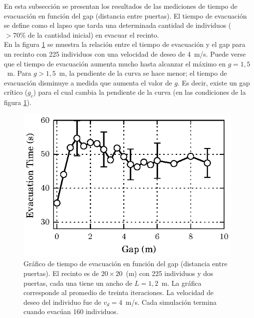 En esta subsección se presentan los resultados de las mediciones de tiempo de evacuación en función del gap (distancia entre puertas).
El tiempo de evacuación se define como el lapso que tarda una determinada cantidad de individuos ($>70\%$ de la cantidad inicial) en evacuar el recinto. \\

En la figura \ref{gap_vste_225_v4} se muestra la relación entre el tiempo de evacuación y el gap para un recinto con 225 individuos con una velocidad de deseo de 4~m/s. Puede verse que el tiempo de evacuación aumenta mucho hasta alcanzar el máximo en $g=1,5$~m. Para $g>1,5$~m, la pendiente de la curva se hace menor; el tiempo de evacuación disminuye a medida que aumenta el valor de $g$. 
Es decir, existe un gap crítico ($g_c$) para el cual cambia la pendiente de la curva (en las condiciones de la figura \ref{gap_vste_225_v4}).

\begin{figure}[H]
    \centering
    \includegraphics[scale=1.6]{figuras/gap_vste_225_v4.eps}
    \caption[width=5cm]{Gráfico de tiempo de evacuación en función del gap (distancia entre puertas). El recinto es de $20\times 20$~(m) con 225 individuos y dos puertas, cada una tiene un ancho de $L=1,2$~m. La gráfica corresponde al promedio de treinta iteraciones. La velocidad de deseo del individuo fue de $v_d=4$~m/s. Cada simulación termina cuando evacúan 160 individuos.}
    \label{gap_vste_225_v4}
\end{figure}


